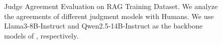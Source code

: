 \begin{figure}[t]
    \caption{Judge Agreement Evaluation on RAG Training Dataset. We analyze the agreements of different judgment models with Humans. We use Llama3-8B-Instruct and Qwen2.5-14B-Instruct as the backbone models of \method{}, respectively.}
    \label{fig:human_consist}
\end{figure}
